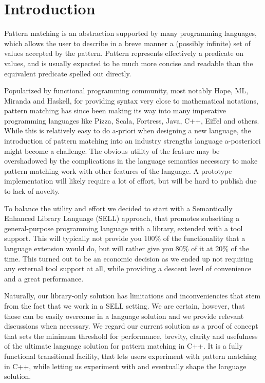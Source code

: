 \documentclass[preprint]{sigplanconf}
\begin{document}
\section{Introduction} %
\label{sec:intro}


Pattern matching is an abstraction supported by many programming languages, which 
allows the user to describe in a breve manner a (possibly infinite) set of 
values accepted by the pattern. Pattern represents effectively a predicate on 
values, and is usually expected to be much more concise and readable than the 
equivalent predicate spelled out directly.

Popularized by functional programming community, most notably Hope\cite{BMS80}, 
ML\cite{ML90}, Miranda\cite{Miranda85} and Haskell\cite{Haskell98Book}, for 
providing syntax very close to mathematical notations, pattern matching has 
since been making its way into many imperative programming languages like 
Pizza\cite{Odersky97pizzainto}, Scala\cite{Scala2nd}, Fortress\cite{RPS10}, 
Java\cite{Liu03jmatch:iterable,HydroJ2003}, C++\cite{Prop96}, 
Eiffel\cite{Moreau:2003} and others. While this is relatively
easy to do a-priori when designing a new language, the introduction of pattern 
matching into an industry strengths language a-posteriori might become a 
challenge. The obvious utility of the feature may be overshadowed by the 
complications in the language semantics necessary to make pattern matching work 
with other features of the language. A prototype implementation will likely 
require a lot of effort, but will be hard to publish due to lack of novelty.

To balance the utility and effort we decided to start with a Semantically 
Enhanced Library Language (SELL) approach\cite{SELL}, that promotes subsetting a
general-purpose programming language with a library, extended with a tool 
support. This will typically not provide you 100\% of the functionality that a 
language extension would do, but will rather give you 80\% of it at 20\% of the 
time. This turned out to be an economic decision as we ended up not requiring 
any external tool support at all, while providing a descent level of convenience 
and a great performance.

Naturally, our library-only solution has limitations and inconveniencies that 
stem from the fact that we work in a SELL setting. We are certain, however, that 
those can be easily overcome in a language solution and we provide relevant 
discussions when necessary. We regard our current solution as a proof of  
concept that sets the minimum threshold for performance, brevity, clarity and 
usefulness of the ultimate language solution for pattern matching in C++. It is 
a fully functional transitional facility, that lets users experiment with 
pattern matching in C++, while letting us experiment with and eventually shape 
the language solution.
\end{document}
